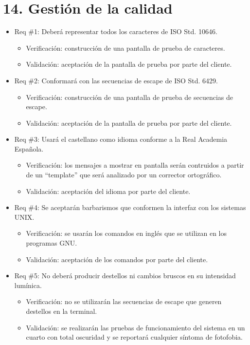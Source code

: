 \documentclass[
11pt, %
]{charter}
\begin{document}
\section{14. Gestión de la calidad}
\label{sec:calidad}

\begin{itemize} 
\item Req \#1: Deberá representar todos los caracteres de ISO Std. 10646.
\begin{itemize}
	\item Verificación: construcción de una pantalla de prueba de caracteres.
	\item Validación: aceptación de la pantalla de prueba por parte del cliente.  
\end{itemize}

\item Req \#2: Conformará con las secuencias de escape de ISO Std. 6429.
\begin{itemize}
    \item Verificación: construcción de una pantalla de prueba de secuencias de escape.
    \item Validación: aceptación de la pantalla de prueba por parte del cliente.
\end{itemize}

\item Req \#3: Usará el castellano como idioma conforme a la Real Academia Española.
\begin{itemize}
    \item Verificación: los mensajes a mostrar en pantalla serán contruidos a partir de un ``template'' que será analizado por un corrector ortográfico.
    \item Validación: aceptación del idioma por parte del cliente.
\end{itemize}

\item Req \#4: Se aceptarán barbarismos que conformen la interfaz con los sistemas UNIX.
\begin{itemize}
    \item Verificación: se usarán los comandos en inglés que se utilizan en los programas GNU.
    \item Validación: aceptación de los comandos por parte del cliente.
\end{itemize}

\item Req \#5: No deberá producir destellos ni cambios bruscos en su intensidad lumínica.
\begin{itemize}
    \item Verificación: no se utilizarán las secuencias de escape que generen destellos en la terminal.
    \item Validación: se realizarán las pruebas de funcionamiento del sistema en un cuarto con total oscuridad y se reportará cualquier síntoma de fotofobia.
\end{itemize}


\end{itemize}
\end{document}
